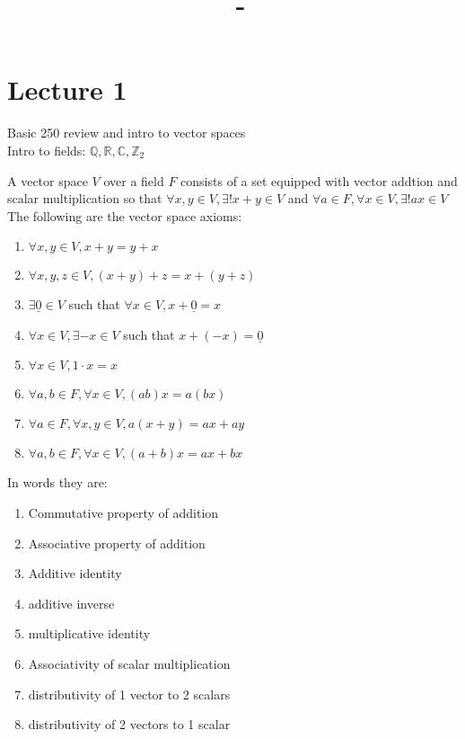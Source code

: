 \documentclass[answers,12pt,addpoints]{exam}
\author{\name}
\title{\course \ - \assignment}
\begin{document}
\maketitle
\tableofcontents
\newpage
\section{Lecture 1}
Basic 250 review and intro to vector spaces\\
Intro to fields: $\mathbb{Q}, \mathbb{R}, \mathbb{C}, \mathbb{Z}_2$\\

\begin{definition}
    A vector space $V$ over a field $F$ consists of a set equipped with vector addtion and scalar multiplication so that $\forall x,y \in V, \exists! x+y \in V$ and $\forall a \in F, \forall x \in V, \exists! ax \in V$\\
    The following are the vector space axioms:
    \begin{enumerate}
        \item $\forall x,y \in V, x+y = y+x$
        \item $\forall x,y,z \in V, (x+y)+z = x+(y+z)$
        \item $\exists \underline{0} \in V$ such that $\forall x \in V, x + \underline{0} = x$
        \item $\forall x \in V, \exists -x \in V$ such that $x + (-x) = \underline{0}$
        \item $\forall x \in V, 1 \cdot x = x$
        \item $\forall a,b \in F, \forall x \in V, (ab)x = a(bx)$
        \item $\forall a \in F, \forall x,y \in V, a(x+y) = ax + ay$
        \item $\forall a,b \in F, \forall x \in V, (a+b)x = ax + bx$
    \end{enumerate}
    In words they are:
    \begin{enumerate}
        \item Commutative property of addition
        \item Associative property of addition
        \item Additive identity 
        \item additive inverse
        \item multiplicative identity 
        \item Associativity of scalar multiplication
        \item distributivity of 1 vector to 2 scalars
        \item distributivity of 2 vectors to 1 scalar
    \end{enumerate}    
\end{definition}
\end{document}
